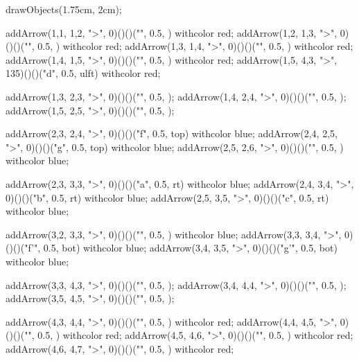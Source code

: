   drawObjects(1.75cm, 2cm);
  
  addArrow(1,1, 1,2, ">", 0)()()("", 0.5, ) withcolor red;
  addArrow(1,2, 1,3, ">", 0)()()("", 0.5, ) withcolor red;
  addArrow(1,3, 1,4, ">", 0)()()("", 0.5, ) withcolor red;
  addArrow(1,4, 1,5, ">", 0)()()("", 0.5, ) withcolor red;
  addArrow(1,5, 4,3, ">", 135)()()("d", 0.5, ulft) withcolor red;
  
  addArrow(1,3, 2,3, ">", 0)()()("", 0.5, );
  addArrow(1,4, 2,4, ">", 0)()()("", 0.5, );
  addArrow(1,5, 2,5, ">", 0)()()("", 0.5, );
  
  addArrow(2,3, 2,4, ">", 0)()()("f", 0.5, top) withcolor blue;
  addArrow(2,4, 2,5, ">", 0)()()("g", 0.5, top) withcolor blue;
  addArrow(2,5, 2,6, ">", 0)()()("", 0.5, ) withcolor blue;

  addArrow(2,3, 3,3, ">", 0)()()("a", 0.5, rt) withcolor blue;
  addArrow(2,4, 3,4, ">", 0)()()("b", 0.5, rt) withcolor blue;
  addArrow(2,5, 3,5, ">", 0)()()("c", 0.5, rt) withcolor blue;

  addArrow(3,2, 3,3, ">", 0)()()("", 0.5, ) withcolor blue;
  addArrow(3,3, 3,4, ">", 0)()()("f'", 0.5, bot) withcolor blue;
  addArrow(3,4, 3,5, ">", 0)()()("g'", 0.5, bot) withcolor blue;

  addArrow(3,3, 4,3, ">", 0)()()("", 0.5, );
  addArrow(3,4, 4,4, ">", 0)()()("", 0.5, );
  addArrow(3,5, 4,5, ">", 0)()()("", 0.5, );
  
  addArrow(4,3, 4,4, ">", 0)()()("", 0.5, ) withcolor red;
  addArrow(4,4, 4,5, ">", 0)()()("", 0.5, ) withcolor red;
  addArrow(4,5, 4,6, ">", 0)()()("", 0.5, ) withcolor red;
  addArrow(4,6, 4,7, ">", 0)()()("", 0.5, ) withcolor red;

\stopMPcode\stopformula
\stopbuffer

\processTEXbuffer

\typebuffer


\stopchapter 
